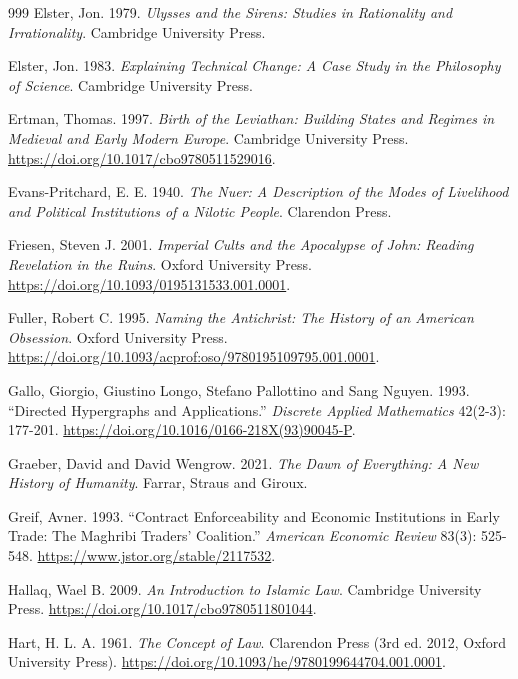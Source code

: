 \documentclass[11pt,letterpaper]{article}
\theoremstyle{definition}
\theoremstyle{remark}
\begin{document}
\begin{small}
\begin{thebibliography}{999}
Elster, Jon. 1979. \emph{Ulysses and the Sirens: Studies in Rationality and Irrationality}. Cambridge University Press.

Elster, Jon. 1983. \emph{Explaining Technical Change: A Case Study in the Philosophy of Science}. Cambridge University Press.

Ertman, Thomas. 1997. \emph{Birth of the Leviathan: Building States and Regimes in Medieval and Early Modern Europe}. Cambridge University Press. \url{https://doi.org/10.1017/cbo9780511529016}.

Evans-Pritchard, E. E. 1940. \emph{The Nuer: A Description of the Modes of Livelihood and Political Institutions of a Nilotic People}. Clarendon Press.

Friesen, Steven J. 2001. \emph{Imperial Cults and the Apocalypse of John: Reading Revelation in the Ruins}. Oxford University Press. \url{https://doi.org/10.1093/0195131533.001.0001}.

Fuller, Robert C. 1995. \emph{Naming the Antichrist: The History of an American Obsession}. Oxford University Press. \url{https://doi.org/10.1093/acprof:oso/9780195109795.001.0001}.

Gallo, Giorgio, Giustino Longo, Stefano Pallottino and Sang Nguyen. 1993. ``Directed Hypergraphs and Applications.'' \emph{Discrete Applied Mathematics} 42(2-3): 177-201. \url{https://doi.org/10.1016/0166-218X(93)90045-P}.

Graeber, David and David Wengrow. 2021. \emph{The Dawn of Everything: A New History of Humanity}. Farrar, Straus and Giroux.

Greif, Avner. 1993. ``Contract Enforceability and Economic Institutions in Early Trade: The Maghribi Traders' Coalition.'' \emph{American Economic Review} 83(3): 525-548. \url{https://www.jstor.org/stable/2117532}.

Hallaq, Wael B. 2009. \emph{An Introduction to Islamic Law}. Cambridge University Press. \url{https://doi.org/10.1017/cbo9780511801044}.

Hart, H. L. A. 1961. \emph{The Concept of Law}. Clarendon Press (3rd ed. 2012, Oxford University Press). \url{https://doi.org/10.1093/he/9780199644704.001.0001}.


\end{thebibliography}
\end{small}
\end{document}
